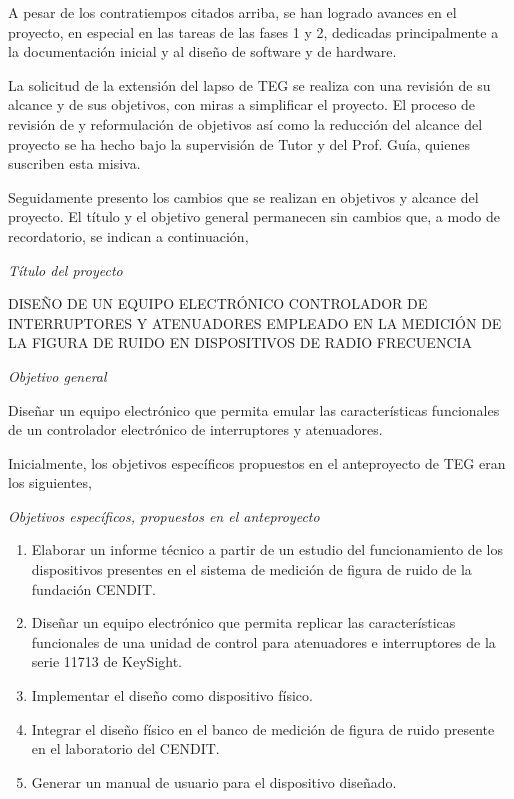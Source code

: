 \documentclass[paper=letter,oneside,fontsize=12pt, parskip=full]{article}
\begin{document}
	A pesar de los contratiempos citados arriba, se han logrado avances en el proyecto, en especial en las tareas de las fases 1 y 2, dedicadas principalmente a la documentación inicial y al diseño de software y de hardware. 
	
	La solicitud de la extensión del lapso de TEG se realiza con una revisión de su alcance y de sus objetivos, con miras a simplificar el proyecto. El proceso de revisión de y reformulación de objetivos así como la reducción del alcance del proyecto se ha hecho bajo la supervisión de Tutor y del Prof. Guía, quienes suscriben esta misiva. 
	
	Seguidamente presento los cambios que se realizan en objetivos y alcance del proyecto. El título y el objetivo general permanecen sin cambios que, a modo de recordatorio, se indican a continuación,	
	
	\emph{Título del proyecto}

	\begin{minipage}{0.95\textwidth}
		\centering
		DISEÑO DE UN EQUIPO ELECTRÓNICO CONTROLADOR DE INTERRUPTORES Y ATENUADORES EMPLEADO EN LA MEDICIÓN DE LA FIGURA DE RUIDO EN DISPOSITIVOS DE RADIO FRECUENCIA
	\end{minipage}

	\emph{Objetivo general}
	
	\hfill%
	\begin{minipage}{0.95\textwidth}
		Diseñar un equipo electrónico que permita emular las características funcionales de un controlador electrónico de interruptores y atenuadores.
	\end{minipage}
	
	Inicialmente, los objetivos específicos propuestos en el anteproyecto de TEG eran los siguientes,
	
	\emph{Objetivos específicos, propuestos en el anteproyecto}
	
	\begin{enumerate}
		\item Elaborar un informe técnico a partir de un estudio del funcionamiento de los
		dispositivos presentes en el sistema de medición de figura de ruido de la fundación
		CENDIT.
		
		\item Diseñar un equipo electrónico que permita replicar las características funcionales de
		una unidad de control para atenuadores e interruptores de la serie 11713 de KeySight.
		
		\item Implementar el diseño como dispositivo físico.
		
		\item Integrar el diseño físico en el banco de medición de figura de ruido presente en el
		laboratorio del CENDIT.
		
		\item Generar un manual de usuario para el dispositivo diseñado.
	\end{enumerate}	
	
\end{document}

